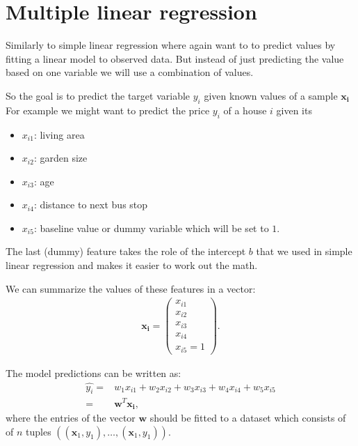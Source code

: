 \chapter{Multiple linear regression}
Similarly to simple linear regression where again want to 
to predict values by fitting a linear model to observed data.
But instead of just predicting the value based on one variable we will use a combination of values.

So the goal is to predict the target variable $y_{i}$ given known values of a sample $\bm{x_{i}}$ \\
For example we might want to predict the price $y_{i}$ of a house $i$ given its
\begin{itemize}
\item $x_{i1}$: living area
\item $x_{i2}$: garden size
\item $x_{i3}$: age
\item $x_{i4}$: distance to next bus stop
\item $x_{i5}$: baseline value or dummy variable which will be set to $1$.
\end{itemize}

The last (dummy) feature takes the role of the intercept $b$ that we used in simple linear regression and makes it easier
to work out the math.

We can summarize the values of these features in a vector:
\begin{align}
    \bm{x_{i}} = \begin{pmatrix}
    x_{i1}\\
    x_{i2}\\
    x_{i3}\\
    x_{i4}\\
    x_{i5} =1
    \end{pmatrix}.
\end{align}

The model predictions can be written as:
\begin{align}
\hat{y_{i}} =& w_{1}x_{i1} + w_{2}x_{i2} + w_{3}x_{i3} + w_{4}x_{i4} + w_{5}x_{i5}  \\
            =& \bm{w}^T \bm{x_{i}},
\end{align}
where the entries of the vector $\bm{w}$ should be fitted to a dataset which consists of of $n$ tuples
$((\bm{x}_1, y_1), \hdots, (\bm{x}_1, y_1))$.

